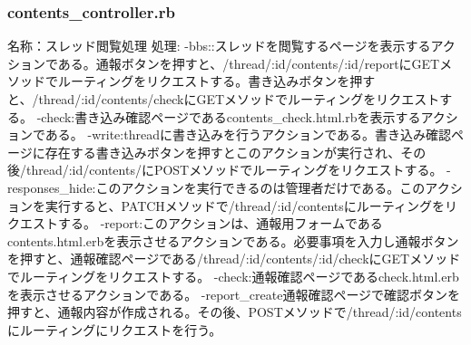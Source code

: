 \documentclass[a4j]{jarticle}
\begin{document}
\subsubsection{contents\_controller.rb}
\noindent 名称：スレッド閲覧処理 \newline
処理:\newline
-bbs::スレッドを閲覧するページを表示するアクションである。通報ボタンを押すと、/thread/:id/contents/:id/reportにGETメソッドでルーティングをリクエストする。書き込みボタンを押すと、/thread/:id/contents/checkにGETメソッドでルーティングをリクエストする。\newline
-check:書き込み確認ページであるcontents\_check.html.rbを表示するアクションである。\newline
-write:threadに書き込みを行うアクションである。書き込み確認ページに存在する書き込みボタンを押すとこのアクションが実行され、その後/thread/:id/contents/にPOSTメソッドでルーティングをリクエストする。\newline
-responses\_hide:このアクションを実行できるのは管理者だけである。このアクションを実行すると、PATCHメソッドで/thread/:id/contentsにルーティングをリクエストする。\newline
-report:このアクションは、通報用フォームであるcontents.html.erbを表示させるアクションである。必要事項を入力し通報ボタンを押すと、通報確認ページである/thread/:id/contents/:id/checkにGETメソッドでルーティングをリクエストする。\newline
-check:通報確認ページであるcheck.html.erbを表示させるアクションである。\newline
-report\_create通報確認ページで確認ボタンを押すと、通報内容が作成される。その後、POSTメソッドで/thread/:id/contentsにルーティングにリクエストを行う。


\appendix
\end{document}
